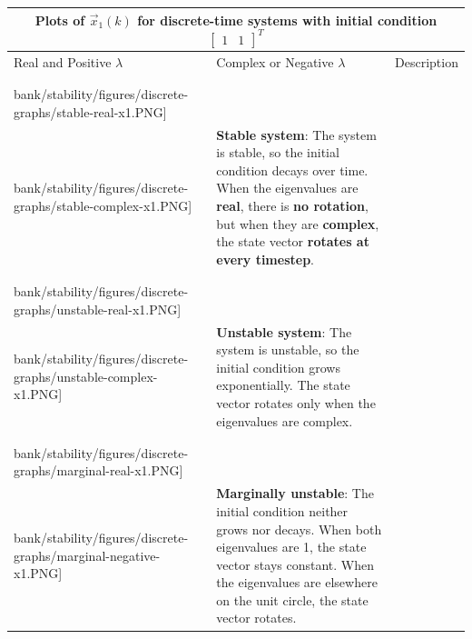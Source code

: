 \begin{tabular}{|m{}|m{}|m{}|}
    \multicolumn{3}{c}{Plots of $\vec{x}_1(k)$ for discrete-time systems with initial condition $\begin{bmatrix} 1 & 1 \end{bmatrix}^T$} \\
    \hline
    Real and Positive $\lambda$ & Complex or Negative $\lambda$ & Description \\
    \hline & & \\
    \texttt{[image: \\bank/stability/figures/discrete-graphs/stable-real-x1.PNG]} &
    \texttt{[image: \\bank/stability/figures/discrete-graphs/stable-complex-x1.PNG]} &
    \textbf{Stable system}: The system is stable, so the initial condition decays over time. When the eigenvalues are \textbf{real}, there is \textbf{no rotation}, but when they are \textbf{complex}, the state vector \textbf{rotates at every timestep}.\\
    \hline & & \\
    \texttt{[image: \\bank/stability/figures/discrete-graphs/unstable-real-x1.PNG]} &
    \texttt{[image: \\bank/stability/figures/discrete-graphs/unstable-complex-x1.PNG]} &
    \textbf{Unstable system}: The system is unstable, so the initial condition grows exponentially. The state vector rotates only when the eigenvalues are complex. \\
    \hline & & \\
    \texttt{[image: \\bank/stability/figures/discrete-graphs/marginal-real-x1.PNG]} &
    \texttt{[image: \\bank/stability/figures/discrete-graphs/marginal-negative-x1.PNG]} &
    \textbf{Marginally unstable}: The initial condition neither grows nor decays. When both eigenvalues are 1, the state vector stays constant. When the eigenvalues are elsewhere on the unit circle, the state vector rotates.\vspace{2mm}\\
    \hline
\end{tabular}

